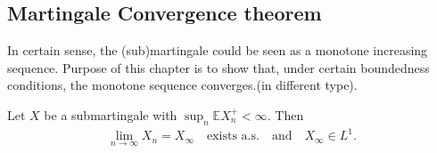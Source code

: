 \subsection{Martingale Convergence theorem}
In certain sense, the (sub)martingale could be seen as a monotone increasing sequence. Purpose of this chapter is to show that, under certain boundedness conditions, the monotone sequence converges.(in different type).
\begin{theorem}
	Let $X$ be a submartingale with $\sup_n \mathbb{E} X_n^+ < \infty$. Then
\begin{align*}
		\lim_{n \rightarrow \infty} X_n = X_\infty \quad \text{exists a.s.} \quad \text{and} \quad X_\infty \in L^1.
\end{align*}
\end{theorem}
